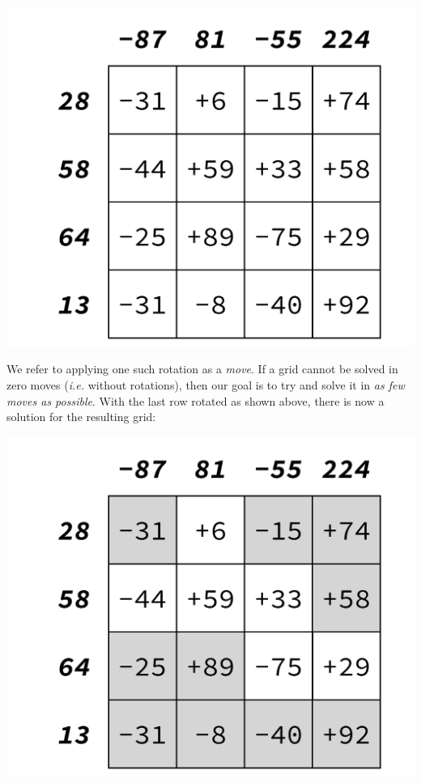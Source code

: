 \begin{center}
	\includegraphics[scale=0.4,trim=0 30 0 30]{cswk/lac3r.pdf}
\end{center}
We refer to applying one such rotation as a \emph{move}. If a grid cannot be solved in zero moves (\emph{i.e.} without rotations), then our goal is to try and solve it in \emph{as few moves as possible}. With the last row rotated as shown above, there is now a solution for the resulting grid:
\begin{center}
	\includegraphics[scale=0.4,trim=0 30 0 30]{cswk/lac3s.pdf}
\end{center}
